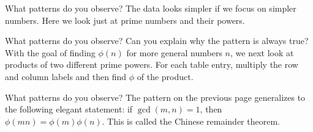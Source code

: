 \documentclass[12pt]{exam}
\newcommand{\Z}{\mathbb Z}
\begin{document}
\begin{questions}
  \begin{center}
  \end{center}
  What patterns do you observe?
  \newpage
  \question The data looks simpler if we focus on simpler numbers. Here we look just at prime numbers and their powers.
  \begin{center}
    \qquad
    \qquad
  \end{center}
  What patterns do you observe? Can you explain why the pattern is always true?
  \newpage
  \question With the goal of finding $\phi(n)$ for more general numbers $n$, we next look at products of two different prime powers. For each table entry, multiply the row and column labels and then find $\phi$ of the product.
  \begin{center}
  \end{center}
  What patterns do you observe?
  \newpage
  \question The pattern on the previous page generalizes to the following elegant statement: if $\gcd(m,n)=1$, then $\phi(mn)=\phi(m)\phi(n)$. This is called the Chinese remainder theorem.
\end{questions}
\end{document}
